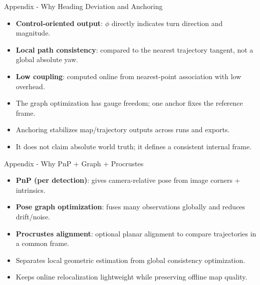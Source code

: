 \begin{frame}[label=appendix-design-heading-anchor]{Appendix - Why Heading Deviation and Anchoring}
\transfade[duration=0.25]
\vspace{-0.06cm}
\begin{outlinecard}
  \small
  \begin{itemize}
    \item \textbf{Control-oriented output}: $\phi$ directly indicates turn direction and magnitude.
    \item \textbf{Local path consistency}: compared to the nearest trajectory tangent, not a global absolute yaw.
    \item \textbf{Low coupling}: computed online from nearest-point association with low overhead.
  \end{itemize}
\end{outlinecard}

\vspace{-0.05cm}
\begin{outlinecard}
  \small
  \begin{itemize}
    \item The graph optimization has gauge freedom; one anchor fixes the reference frame.
    \item Anchoring stabilizes map/trajectory outputs across runs and exports.
    \item It does not claim absolute world truth; it defines a consistent internal frame.
  \end{itemize}
\end{outlinecard}
\end{frame}

\begin{frame}[label=appendix-design-estimation-stack]{Appendix - Why PnP + Graph + Procrustes}
\transfade[duration=0.25]
\vspace{-0.06cm}
\begin{outlinecard}
  \small
  \begin{itemize}
    \item \textbf{PnP (per detection)}: gives camera-relative pose from image corners + intrinsics.
    \item \textbf{Pose graph optimization}: fuses many observations globally and reduces drift/noise.
    \item \textbf{Procrustes alignment}: optional planar alignment to compare trajectories in a common frame.
  \end{itemize}
\end{outlinecard}

\vspace{-0.05cm}
\begin{outlinecard}
  \small
  \begin{itemize}
    \item Separates local geometric estimation from global consistency optimization.
    \item Keeps online relocalization lightweight while preserving offline map quality.
  \end{itemize}
\end{outlinecard}
\end{frame}

